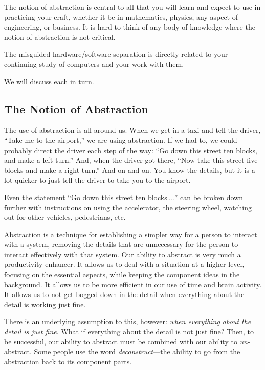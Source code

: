 \documentclass{patt}
\begin{document}
The notion of abstraction is central to all that you will learn and expect
to use in practicing your craft, whether it be in mathematics, physics,
any aspect of engineering, or business. It is hard to think of any body
of knowledge where the notion of abstraction is not critical.

The misguided hardware/software separation is directly related to your 
continuing study of computers and your work with them.  

We will discuss each in turn.

\vspace{-6pt}
\subsection{The Notion of Abstraction}

The use of abstraction is all around us.  When we get in a taxi and
tell the driver, ``Take me to the airport,'' we are using abstraction.
If we had to, we could probably direct the driver each step of the way:
``Go down this street ten blocks, and make a left turn.''  And, when the
driver got there, ``Now take this street five blocks and make a right turn.''
And on and on.  You know the details, but it is a lot quicker to just
tell the driver to take you to the airport.

Even the statement ``Go down this street ten blocks\,$\ldots$'' can be broken
down further with instructions on using the accelerator, the steering wheel,
watching out for other vehicles, pedestrians, etc.

Abstraction is a technique for establishing a simpler way for a person to
interact with a system, removing the details that are unnecessary for the 
person to interact effectively with that system.  Our ability to abstract is 
very much a productivity enhancer.  It allows us to deal with a situation 
at a higher level, focusing
on the essential aspects, while keeping the component ideas in the background.
It allows us to be more efficient in our use of time and brain activity.
It allows us to not get bogged down in the detail when everything about the
detail is working just fine.

There is an underlying assumption to this, however: {\em when everything about 
the detail is just fine}.  What if everything about the detail is not just
fine? Then, to be successful, our ability to abstract must be combined with our
ability to {\em un}-abstract.  Some people use the word {\em deconstruct}---the
ability to go from the abstraction back to its component parts.
\end{document}
